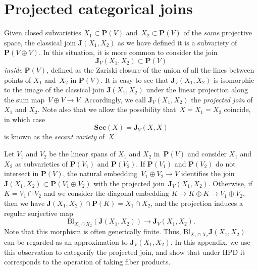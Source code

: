 \documentclass[11pt, reqno]{amsart}
\numberwithin{equation}{section}
\theoremstyle{plain}
\theoremstyle{definition}
\newcommand{\Sec}{\mathbf{Sec}}
\newcommand{\Bl}{\mathrm{Bl}}
\newcommand{\bJ}{\mathbf{J}}
\newcommand{\bP}{\mathbf{P}}
\begin{document}

\section{Projected categorical joins}
\label{section-future}


Given closed subvarieties $X_1 \subset \bP(V)$ and~$X_2 \subset \bP(V)$ of the \emph{same} projective space, 
the classical join $\bJ(X_1, X_2)$ as we have defined it is a subvariety of~$\bP(V \oplus V)$.  
In this situation, it is more common to consider the join
\begin{equation*}
\bJ_V(X_1, X_2) \subset \bP(V)
\end{equation*}
\emph{inside} $\bP(V)$, 
defined as the Zariski closure of the 
union of all the lines between points of $X_1$ and~$X_2$ in $\bP(V)$. 
It is easy to see that $\bJ_V(X_1, X_2)$ is isomorphic to the image of {the classical join} $\bJ(X_1,X_2)$ under the linear projection
along the sum map~$V \oplus V \to V$. 
Accordingly, we call $\bJ_V(X_1, X_2)$ the \emph{projected join} of $X_1$ and $X_2$. 
Note also that we allow the possibility that~$X = X_1 = X_2$ coincide, 
in which case 
\begin{equation*}
\Sec(X) =  \bJ_V(X, X)
\end{equation*}
is known as the \emph{secant variety} of~$X$.

Let $V_1$ and $V_2$ be the linear spans of $X_1$ and $X_2$ in~$\bP(V)$ and
consider $X_1$ and $X_2$ as subvarieties of $\bP(V_1)$ and $\bP(V_2)$.
If $\bP(V_1)$ and $\bP(V_2)$ do not intersect in $\bP(V)$, the natural embedding~$V_1 \oplus V_2 \to V$
identifies the join $\bJ(X_1,X_2) \subset \bP(V_1 \oplus V_2)$ with the projected join~$\bJ_V(X_1,X_2)$. 
Otherwise, if $K = V_1 \cap V_2$ and we consider the diagonal embedding \mbox{$K \to K \oplus K \to V_1 \oplus V_2$}, then 
we have $\bJ(X_1, X_2) \cap \bP(K) = X_1 \cap X_2$, 
and the projection induces a regular surjective map 
\begin{equation}
\label{projected-join-map} 
\Bl_{X_{1} \cap X_{2}} (\bJ(X_1, X_2)) \to \bJ_V(X_1, X_2).
\end{equation}  
Note that this morphism is often generically finite. 
Thus, $\Bl_{X_{1} \cap X_{2}} \bJ(X_1, X_2)$ can be regarded as an approximation to $\bJ_V(X_1, X_2)$. 
In this appendix, we use this observation to categorify the projected join, 
and show that under HPD it corresponds to the operation of taking fiber products. 
\end{document}

